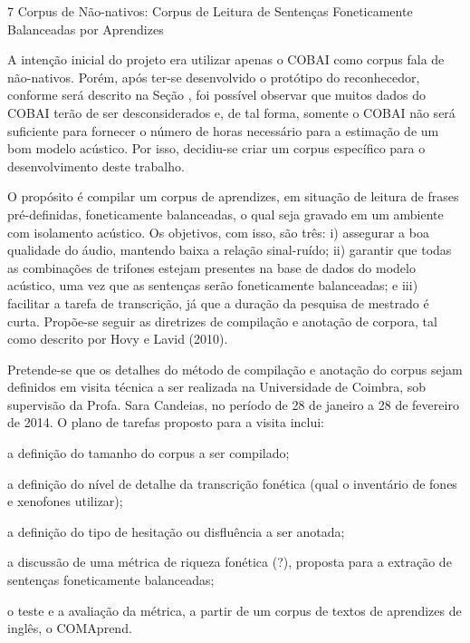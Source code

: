 7 Corpus de N\~ao-nativos: Corpus de Leitura de Senten\c{c}as Foneticamente
Balanceadas por Aprendizes

A inten\c{c}\~ao inicial do projeto era utilizar apenas o COBAI como corpus
fala de n\~ao-nativos. Por\'em, ap\'os ter-se desenvolvido o prot\'otipo do
reconhecedor, conforme ser\'a descrito na Se\c{c}\~ao , foi poss\'ivel observar
que muitos dados do COBAI ter\~ao de ser desconsiderados e, de tal forma,
somente o COBAI n\~ao ser\'a suficiente para fornecer o n\'umero de horas
necess\'ario para a estima\c{c}\~ao de um bom modelo ac\'ustico. Por isso,
decidiu-se criar um corpus espec\'ifico para o desenvolvimento deste
trabalho.

O prop\'osito \'e compilar um corpus de aprendizes, em situa\c{c}\~ao de leitura
de frases pr\'e-definidas, foneticamente balanceadas, o qual seja gravado
em um ambiente com isolamento ac\'ustico. Os objetivos, com isso, s\~ao
tr\^es: i) assegurar a boa qualidade do \'audio, mantendo baixa a rela\c{c}\~ao
sinal-ru\'ido; ii) garantir que todas as combina\c{c}\~oes de trifones estejam
presentes na base de dados do modelo ac\'ustico, uma vez que as senten\c{c}as
ser\~ao foneticamente balanceadas; e iii) facilitar a tarefa de
transcri\c{c}\~ao, j\'a que a dura\c{c}\~ao da pesquisa de mestrado \'e curta. Prop\~oe-se
seguir as diretrizes de compila\c{c}\~ao e anota\c{c}\~ao de corpora, tal como
descrito por Hovy e Lavid (2010).

Pretende-se que os detalhes do m\'etodo de compila\c{c}\~ao e anota\c{c}\~ao do corpus
sejam definidos em visita t\'ecnica a ser realizada na Universidade de
Coimbra, sob supervis\~ao da Profa. Sara Candeias, no per\'iodo de 28 de
janeiro a 28 de fevereiro de 2014. O plano de tarefas proposto para a
visita inclui:

a defini\c{c}\~ao do tamanho do corpus a ser compilado;

a defini\c{c}\~ao do n\'ivel de detalhe da transcri\c{c}\~ao fon\'etica (qual o
invent\'ario de fones e xenofones utilizar);

a defini\c{c}\~ao do tipo de hesita\c{c}\~ao ou disflu\^encia a ser anotada;

a discuss\~ao de uma m\'etrica de riqueza fon\'etica (?), proposta para a
extra\c{c}\~ao de senten\c{c}as foneticamente balanceadas;

o teste e a avalia\c{c}\~ao da m\'etrica, a partir de um corpus de textos de
aprendizes de ingl\^es, o COMAprend.

